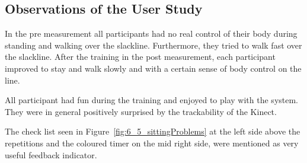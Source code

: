 \begin{table}[htb]
\centering
\caption{Interaction, time, and group effects on single leg stance, walking steps, and walked distance}
\label{tab:6_4_mainEffects}
\end{table}

\subsection{Observations of the User Study}\label{results_interview}
In the pre measurement all participants had no real control of their body during standing and walking over the slackline.
Furthermore, they tried to walk fast over the slackline.
After the training in the post measurement, each participant improved to stay and walk slowly and with a certain sense of body control on the line.

All participant had fun during the training and enjoyed to play with the system.
They were in general positively surprised by the trackability of the Kinect.

The check list seen in Figure~\ref{fig:6_5_sittingProblems} at the left side above the repetitions and the coloured timer on the mid right side, were mentioned as very useful feedback indicator.

